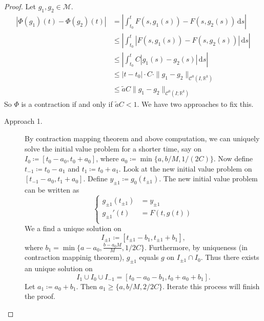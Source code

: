 \documentclass[12pt]{article}
\theoremstyle{plain}
\theoremstyle{definition}
\begin{document}
\begin{proof}
    Let $g_1,g_2\in\mathcal{M}$.
    $$\begin{aligned}
        |\Phi(g_1)(t)-\Phi(g_2)(t)|
        &=\left|\int_{t_0}^tF(s,g_1(s)) - F(s,g_2(s))\,\mathrm{d}s\right|\\
        &\leq \left|\int_{t_0}^t |F(s,g_1(s)) -F(s,g_2(s))|\,\mathrm{d}s\right|\\
        &\leq \left|\int_{t_0}^t C|g_1(s)-g_2(s)|\,\mathrm{d}s\right|\\
        &\leq |t-t_0|\cdot C\cdot \|g_1-g_2\|_{\mathcal{C}^0(I,\mathbb{R}^k)}\\
        &\leq \tilde{a} C\|g_1-g_2\|_{\mathcal{C}^0(I;\mathbb{R}^k)}
    \end{aligned}$$
    So $\Phi$ is a contraction if and only if $\tilde{a}C<1$.
    We have two approaches to fix this.
    \begin{description}
        \item[Approach 1.]
        By contraction mapping theorem and above computation, we can uniquely
        solve the initial value problem for a shorter time, say on
        $I_0\coloneqq[t_0-a_0,t_0+a_0]$, where $a_0\coloneqq\min\{a,b/M,1/(2C)\}$.
        Now define $t_{-1}\coloneqq t_0-a_1$ and $t_{1}\coloneqq t_0+a_1$.
        Look at the new initial value problem on $[t_{-1}-a_0,t_1+a_0]$.
        Define $y_{\pm1}\coloneqq g_0(t_{\pm1})$.
        The new initial value problem can be written as
        $$\left\{
            \begin{aligned}
                g_{\pm1}(t_{\pm1})&=y_{\pm1}\\
                g_{\pm1}'(t)&=F(t,g(t))\\
            \end{aligned}
        \right.$$
        We a find a unique solution on
        $$I_{\pm 1}\coloneqq [t_{\pm1}-b_1, t_{\pm1}+b_1],$$
        where $b_1=\min\{a-a_0,\frac{b-a_0M}{M},1/2C\}$.
        Furthermore, by uniqueness (in contraction mappinig theorem),
        $g_{\pm 1}$ equals $g$ on $I_{\pm1}\cap I_0$.
        Thus there exists an unique solution on 
        $$I_1\cup I_0\cup I_{-1}=[t_0-a_0-b_1,t_0+a_0+b_1].$$
        Let $a_1\coloneqq a_0+b_1$.
        Then $a_1\geq \{a,b/M,2/2C\}$.
        Iterate this process will finish the proof.


\end{description}
\end{proof}
\end{document}
